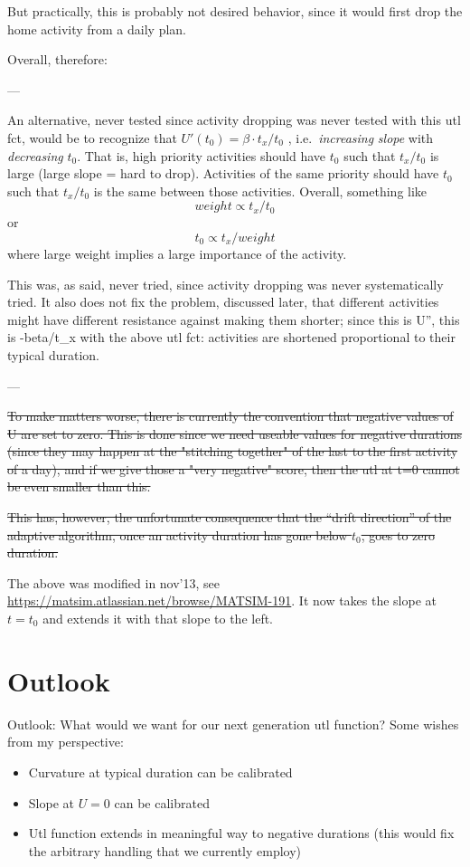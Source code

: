 But practically, this is probably not desired behavior, since it would first drop the home activity from a daily plan.

Overall, therefore: 

---

An  alternative, never tested since activity dropping was never  tested with  this utl fct, would be to recognize that $U'(t_0) = \beta \cdot  t_x / t_0$ ,  i.e.\ \emph{increasing} \emph{slope} with \emph{decreasing}  $t_0$.  That is, high priority activities should have $t_0$ such that  $t_x/t_0$ is  large (large slope = hard to drop). Activities of the  same priority  should have $t_0$ such that $t_x/t_0$ is the same between  those activities.  Overall, something like
\[
weight \propto t_x/t_0
\]
or
\[
t_0 \propto t_x/weight
\]
where large weight implies a large importance of the activity.

This  was, as said, never tried, since activity dropping was never   systematically tried. It also does not fix the problem, discussed   later, that different activities might have different resistance  against  making them shorter; since this is U'', this is -beta/t\_x  with the  above utl fct: activities are shortened proportional to their  typical  duration.

---

\st{To make matters worse, there is currently the  convention that  negative values of U are set to zero. This is done  since we need  useable values for negative durations (since they may  happen at the  "stitching together" of the last to the first activity of a  day), and  if we give those a "very negative" score, then the utl at t=0  cannot be  even smaller than this.}

\st{This has, however, the  unfortunate consequence that the ``drift  direction'' of the adaptive  algorithm, once an activity duration has  gone below $t_0$, goes to zero  duration.}

The above was modified in nov'13, see \url{https://matsim.atlassian.net/browse/MATSIM-191}.  It now takes the slope at $t=t_0$ and extends it with that slope to the left.

\section{Outlook}

Outlook: What would we want for our next generation utl function? Some wishes from my perspective:
\begin{itemize}
	\item Curvature at typical duration can be calibrated
	\item Slope at $U=0$ can be calibrated
	\item Utl function extends in meaningful way to negative durations (this would fix the arbitrary handling that we currently employ)
\end{itemize}

